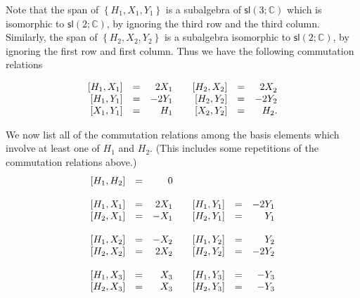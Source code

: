 \documentclass[12pt]{amsbook}
\theoremstyle{plain}
\numberwithin{equation}{chapter}
\numberwithin{theorem}{chapter}
\begin{document}
Note that the span of $\left\{  H_{1},X_{1},Y_{1}\right\}  $ is a subalgebra
of $\mathsf{sl}\left(  3;\mathbb{C}\right)  $ which is isomorphic to
$\mathsf{sl}(2;\mathbb{C})$, by ignoring the third row and the third column.
Similarly, the span of $\left\{  H_{2},X_{2},Y_{2}\right\}  $ is a subalgebra
isomorphic to $\mathsf{sl}(2;\mathbb{C})$, by ignoring the first row and first
column. Thus we have the following commutation relations%

\[%
\begin{array}
[c]{rrrrrrr}%
\left[  H_{1},X_{1}\right]  & = & 2X_{1} &  & \left[  H_{2},X_{2}\right]  &
= & 2X_{2}^{}\\
\left[  H_{1},Y_{1}\right]  & = & -2Y_{1} &  & \left[  H_{2},Y_{2}\right]  &
= & -2Y_{2}\\
\left[  X_{1},Y_{1}\right]  & = & H_{1} &  & \left[  X_{2},Y_{2}\right]  & = &
H_{2}\text{.}%
\end{array}
\]

We now list all of the commutation relations among the basis elements which
involve at least one of $H_{1}$ and $H_{2}$. (This includes some repetitions
of the commutation relations above.)
\begin{equation}%
\begin{array}
[c]{rrrrrrr}%
\left[  H_{1},H_{2}\right]  & = & 0 &  &  &  & \\
&  &  &  &  &  & \\
\left[  H_{1},X_{1}\right]  & = & 2X_{1} &  & \left[  H_{1},Y_{1}\right]  &
= & -2Y_{1}\\
\left[  H_{2},X_{1}\right]  & = & -X_{1} &  & \left[  H_{2},Y_{1}\right]  &
= & Y_{1}\\
&  &  &  &  &  & \\
\left[  H_{1},X_{2}\right]  & = & -X_{2} &  & \left[  H_{1},Y_{2}\right]  &
= & Y_{2}\\
\left[  H_{2},X_{2}\right]  & = & 2X_{2} &  & \left[  H_{2},Y_{2}\right]  &
= & -2Y_{2}\\
&  &  &  &  &  & \\
\left[  H_{1},X_{3}\right]  & = & X_{3} &  & \left[  H_{1},Y_{3}\right]  & = &
-Y_{3}\\
\left[  H_{2},X_{3}\right]  & = & X_{3} &  & \left[  H_{2},Y_{3}\right]  & = &
-Y_{3}%
\end{array}
\label{h.rel}%
\end{equation}
\end{document}
